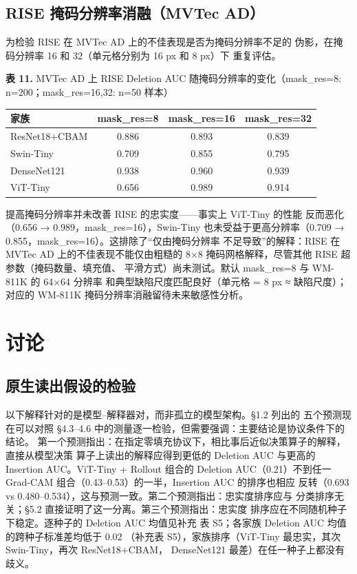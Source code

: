 \documentclass[11pt,a4paper]{article}
\begin{document}
\subsection{RISE 掩码分辨率消融（MVTec AD）}

为检验 RISE 在 MVTec AD 上的不佳表现是否为掩码分辨率不足的 伪影，在掩码分辨率 16 和 32（单元格分别为 16 px 和 8 px）下 重复评估。

\begin{center}
\small \textbf{表 11.} MVTec AD 上 RISE Deletion AUC 随掩码分辨率的变化（mask\_res=8: n=200；mask\_res=16,32: n=50 样本）
\end{center}

\begin{tabular}{lccc}
\toprule
家族 & mask\_res=8 & mask\_res=16 & mask\_res=32 \\
\midrule
ResNet18+CBAM & 0.886 & 0.893 & 0.839 \\
Swin-Tiny & 0.709 & 0.855 & 0.795 \\
DenseNet121 & 0.938 & 0.960 & 0.939 \\
ViT-Tiny & 0.656 & 0.989 & 0.914 \\
\bottomrule
\end{tabular}


提高掩码分辨率并未改善 RISE 的忠实度——事实上 ViT-Tiny 的性能 反而恶化（0.656 → 0.989，mask\_res=16），Swin-Tiny 也未受益于更高分辨率（0.709 → 0.855，mask\_res=16）。这排除了“仅由掩码分辨率 不足导致”的解释：RISE 在 MVTec AD 上的不佳表现不能仅由粗糙的 8×8 掩码网格解释，尽管其他 RISE 超参数（掩码数量、填充值、 平滑方式）尚未测试。默认 mask\_res=8 与 WM-811K 的 64×64 分辨率 和典型缺陷尺度匹配良好（单元格 = 8 px ≈ 缺陷尺度）；对应的 WM-811K 掩码分辨率消融留待未来敏感性分析。


\section{讨论}

\subsection{原生读出假设的检验}

以下解释针对的是模型–解释器对，而非孤立的模型架构。§1.2 列出的 五个预测现在可以对照 §4.3–4.6 中的测量逐一检验，但需要强调：主要结论是协议条件下的结论。 第一个预测指出：在指定零填充协议下，相比事后近似决策算子的解释，直接从模型决策 算子上读出的解释应得到更低的 Deletion AUC 与更高的 Insertion AUC。ViT-Tiny + Rollout 组合的 Deletion AUC（0.21）不到任一 Grad-CAM 组合（0.43–0.53）的一半，Insertion AUC 的排序也相应 反转（0.693 vs 0.480–0.534），这与预测一致。第二个预测指出：忠实度排序应与 分类排序无关；§5.2 直接证明了这一分离。第三个预测指出：忠实度 排序应在不同随机种子下稳定。逐种子的 Deletion AUC 均值见补充 表 S5；各家族 Deletion AUC 均值的跨种子标准差均低于 0.02 （补充表 S5），家族排序（ViT-Tiny 最忠实，其次 Swin-Tiny，再次 ResNet18+CBAM， DenseNet121 最差）在任一种子上都没有歧义。
\end{document}
